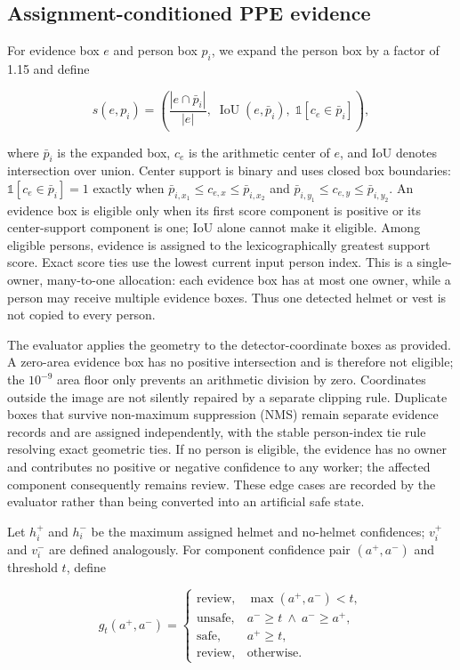 \documentclass[iicol,pdflatex,sn-mathphys-num]{sn-jnl}
\begin{document}
\subsection{Assignment-conditioned PPE evidence}

For evidence box $e$ and person box $p_i$, we expand the person box by a factor of 1.15 and define

\begin{equation}
s(e,p_i)=\left(\frac{|e\cap \bar p_i|}{|e|},\;\operatorname{IoU}(e,\bar p_i),\;\mathbb{1}[c_e\in \bar p_i]\right),
\end{equation}

where $\bar p_i$ is the expanded box, $c_e$ is the arithmetic center of $e$, and IoU denotes intersection over union. Center support is binary and uses closed box boundaries: $\mathbb{1}[c_e\in\bar p_i]=1$ exactly when $\bar p_{i,x_1}\leq c_{e,x}\leq\bar p_{i,x_2}$ and $\bar p_{i,y_1}\leq c_{e,y}\leq\bar p_{i,y_2}$. An evidence box is eligible only when its first score component is positive or its center-support component is one; IoU alone cannot make it eligible. Among eligible persons, evidence is assigned to the lexicographically greatest support score. Exact score ties use the lowest current input person index. This is a single-owner, many-to-one allocation: each evidence box has at most one owner, while a person may receive multiple evidence boxes. Thus one detected helmet or vest is not copied to every person.

The evaluator applies the geometry to the detector-coordinate boxes as provided. A zero-area evidence box has no positive intersection and is therefore not eligible; the $10^{-9}$ area floor only prevents an arithmetic division by zero. Coordinates outside the image are not silently repaired by a separate clipping rule. Duplicate boxes that survive non-maximum suppression (NMS) remain separate evidence records and are assigned independently, with the stable person-index tie rule resolving exact geometric ties. If no person is eligible, the evidence has no owner and contributes no positive or negative confidence to any worker; the affected component consequently remains review. These edge cases are recorded by the evaluator rather than being converted into an artificial safe state.

Let $h_i^+$ and $h_i^-$ be the maximum assigned helmet and no-helmet confidences; $v_i^+$ and $v_i^-$ are defined analogously. For component confidence pair $(a^+,a^-)$ and threshold $t$, define

\begin{equation}
g_t(a^+,a^-)=
\begin{cases}
\mathrm{review}, & \max(a^+,a^-)<t,\\
\mathrm{unsafe}, & a^-\geq t\ \wedge\ a^-\geq a^+,\\
\mathrm{safe}, & a^+\geq t,\\
\mathrm{review}, & \text{otherwise}.
\end{cases}
\end{equation}
\end{document}
